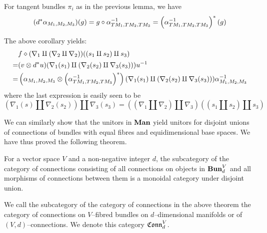\begin{cor}
For tangent bundles $\pi_i$ as in the previous lemma, we have
\[
  (d^*\alpha_{M_1, M_2, M_3})(g) = g \circ \alpha_{TM_1, TM_2, TM_3}^{-1}
    = \left( \alpha^{-1}_{TM_1, TM_2, TM_3} \right)^*(g)
\]
\end{cor}
The above corollary yields:
\begin{align*}
   & f \diamond (\nabla_1 \amalg (\nabla_2 \amalg \nabla_2))(
        (s_1 \amalg s_2) \amalg s_3
     ) \\
  =& (v \otimes d^*u)(
      \nabla_1(s_1) \amalg (\nabla_2(s_2) \amalg \nabla_3(s_3))
     )u^{-1} \\
  =& \left( \alpha_{M_1, M_2, M_3} \otimes \left( \alpha^{-1}_{TM_1, TM_2, TM_3} \right)^* \right)(
      \nabla_1(s_1) \amalg (\nabla_2(s_2) \amalg \nabla_3(s_3))
     )\alpha_{M_1, M_2, M_3}^{-1}
\end{align*}
where the last expression is easily seen to be
\[
  (\nabla_1(s) \amalg \nabla_2(s_2)) \amalg \nabla_3(s_3)
  = ((\nabla_1 \amalg \nabla_2) \amalg \nabla_3)((s_1 \amalg s_2) \amalg s_3)
\]

We can similarly show that the unitors in $\textbf{Man}$ yield unitors for disjoint
unions of connections of bundles with equal fibres and equidimensional base
spaces. We have thus proved the following theorem.
\begin{thm}\label{thm:bundle_gluing}
For a vector space $V$ and a non-negative integer $d$, the subcategory of the
category of connections consisting of all connections on objects in
$\textbf{Bun}_d^{V}$ and all morphisms of connections between them is a monoidal
category under disjoint union.
\end{thm}
\begin{defn}
We call the subcategory of the category of connections in the above theorem the
category of connections on $V$--fibred bundles on $d$--dimensional manifolds or
of $(V, d)$--connections. We denote this category $\mathfrak{Conn}^V_d$.
\end{defn}

